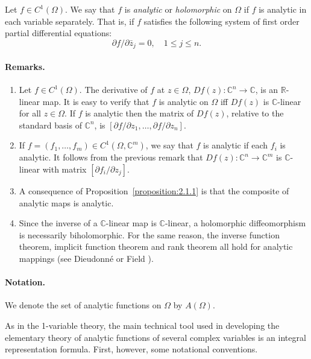  Let $f\in C^1(\Omega)$. We say that $f$ is \emph{analytic} or \emph{holomorphic} on $\Omega$ if $f$ is analytic in each variable separately. That is, if $f$ satisfies the following system of first order partial differential equations:
\[\partial f/\partial\bar z_j=0,\quad 1\leq j\leq n.\]
\paragraph*{Remarks.}
\begin{enumerate}
\item Let $f\in C^1(\Omega)$. The derivative of $f$ at $z\in\Omega$, $Df(z):\mathbb C^n\to\mathbb C$, is an $\mathbb R$-linear map. It is easy to verify that $f$ is analytic on $\Omega$ iff $Df(z)$ is $\mathbb C$-linear for all $z\in\Omega$. If $f$ is analytic then the matrix of $Df(z)$, relative to the standard basis of $\mathbb C^n$, is $[\partial f/\partial z_1,\ldots,\partial f/\partial z_n]$.
\item If $f=(f_1,\ldots,f_m)\in C^1(\Omega,\mathbb C^m)$, we say that $f$ is analytic if each $f_i$ is analytic. It follows from the previous remark that $Df(z):\mathbb C^n\to\mathbb C^m$ is $\mathbb C$-linear with matrix $[\partial f_i/\partial z_j]$.
\item A consequence of Proposition~\ref{proposition:2.1.1} is that the composite of analytic maps is analytic.
\item Since the inverse of a $\mathbb C$-linear map is $\mathbb C$-linear, a holomorphic diffeomorphism is necessarily biholomorphic. For the same reason, the inverse function theorem, implicit function theorem and rank theorem all hold for analytic mappings (see Dieudonn\'e \cite{bib:I:dieudonne-j:1} or Field \cite{bib:I:field-m-j:1}).
\end{enumerate}
\paragraph*{Notation.} We denote the set of analytic functions on $\Omega$ by $A(\Omega)$.

As in the 1-variable theory, the main technical tool used in developing the elementary theory of analytic functions of several complex variables is an integral representation formula. First, however, some notational conventions.

